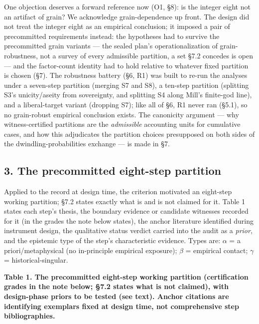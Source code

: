 One objection deserves a forward reference now (O1, \S{}8): is the integer eight not an artifact of grain? We acknowledge grain-dependence up front. The design did not treat the integer eight as an empirical conclusion; it imposed a pair of precommitted requirements instead: the hypotheses had to survive the precommitted grain variants --- the sealed plan's operationalization of grain-robustness, not a survey of every admissible partition, a set \S{}7.2 concedes is open --- and the factor-count identity had to hold relative to whatever fixed partition is chosen (\S{}7). The robustness battery (\S{}6, R1) was built to re-run the analyses under a seven-step partition (merging S7 and S8), a ten-step partition (splitting S3's unicity/aseity from sovereignty, and splitting S4 along Mill's finite-god line), and a liberal-target variant (dropping S7); like all of \S{}6, R1 never ran (\S{}5.1), so no grain-robust empirical conclusion exists. The canonicity argument --- why witness-certified partitions are the \emph{admissible} accounting units for cumulative cases, and how this adjudicates the partition choices presupposed on both sides of the dwindling-probabilities exchange --- is made in \S{}7.

\subsection{3. The precommitted eight-step partition}\label{the-precommitted-eight-step-partition}

Applied to the record at design time, the criterion motivated an eight-step working partition; \S{}7.2 states exactly what is and is not claimed for it. Table 1 states each step's thesis, the boundary evidence or candidate witnesses recorded for it (in the grades the note below states), the anchor literature identified during instrument design, the qualitative status verdict carried into the audit as a \emph{prior}, and the epistemic type of the step's characteristic evidence. Types are: \textbf{$\alpha$} = a priori/metaphysical (no in-principle empirical exposure); \textbf{$\beta$} = empirical contact; \textbf{$\gamma$} = historical-singular.

\textbf{Table 1. The precommitted eight-step working partition (certification grades in the note below; \S{}7.2 states what is not claimed), with design-phase priors to be tested (see text). Anchor citations are identifying exemplars fixed at design time, not comprehensive step bibliographies.}

